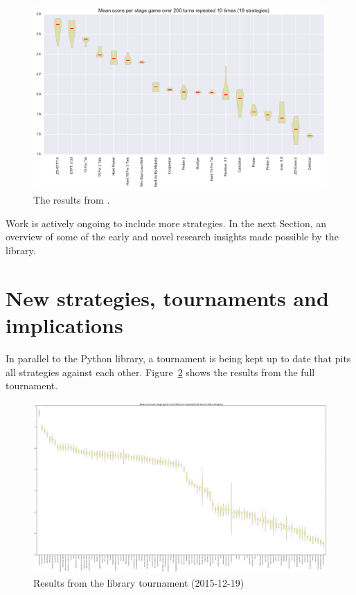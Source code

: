 \documentclass{article}
\begin{document}
\begin{figure}[!hbtp]
    \centering
    \includegraphics[width=.8\textwidth]{../img/stewart_tournament.pdf}
    \caption{The results from \cite{Stewart2012}.}
    \label{fig:stewart_tournament}
\end{figure}

Work is actively ongoing to include more strategies. In the next Section, an
overview of some of the early and novel research insights made possible by the
library.

\section{New strategies, tournaments and implications}\label{sec:new-strategies-and-implications}

In parallel to the Python library, a tournament is being kept up to date that
pits all strategies against each other. Figure~\ref{fig:tournament} shows the
results from the full tournament.

\begin{figure}[!hbtp]
    \centering
    \includegraphics[width=.8\textwidth]{../img/tournament.pdf}
    \caption{Results from the library tournament (2015-12-19)}
    \label{fig:tournament}
\end{figure}
\end{document}
